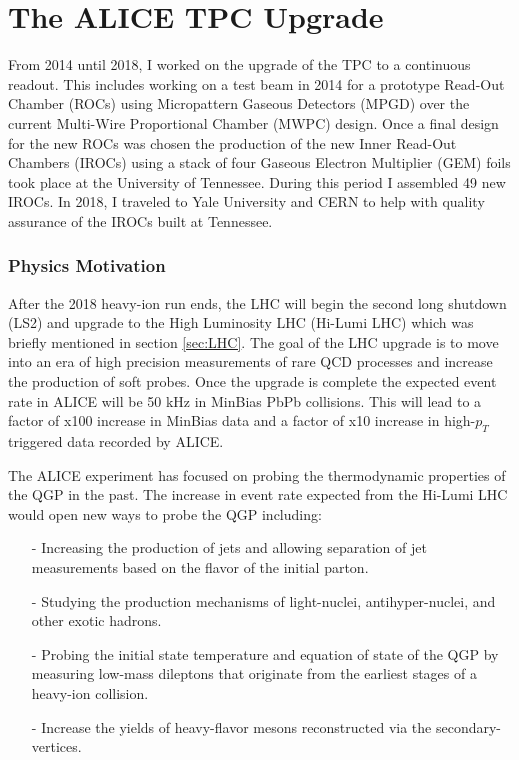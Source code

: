 \chapter{The ALICE TPC Upgrade} \label{ch:tpcu}

From 2014 until 2018, I worked on the upgrade of the TPC to a continuous readout.  This includes working on a test beam in 2014 for a prototype Read-Out Chamber (ROCs) using Micropattern Gaseous Detectors (MPGD) over the current Multi-Wire Proportional Chamber (MWPC) design.  Once a final design for the new ROCs was chosen the production of the new Inner Read-Out Chambers (IROCs) using a stack of four Gaseous Electron Multiplier (GEM) foils took place at the University of Tennessee.  During this period I assembled 49 new IROCs.  In 2018, I traveled to Yale University and CERN to help with quality assurance of the IROCs built at Tennessee.


\subsection{Physics Motivation}
After the 2018 heavy-ion run ends, the LHC will begin the second long shutdown (LS2) and upgrade to the High Luminosity LHC (Hi-Lumi LHC)\cite{Apollinari:2015bam} which was briefly mentioned in section \ref{sec:LHC}.  The goal of the LHC upgrade is to move into an era of high precision measurements of rare QCD processes and increase the production of soft probes.  Once the upgrade is complete the expected event rate in ALICE will be 50 kHz in MinBias PbPb collisions.  This will lead to a factor of x100 increase in MinBias data and a factor of x10 increase in high-$p_{T}$ triggered data recorded by ALICE.

The ALICE experiment has focused on probing the thermodynamic properties of the QGP in the past.  The increase in event rate expected from the Hi-Lumi LHC would open new ways to probe the QGP including\cite{Abelev:1475243}:

\begin{itemize}
\item[-] Increasing the production of jets and allowing separation of jet measurements based on the flavor of the initial parton.
\item[-] Studying the production mechanisms of light-nuclei, antihyper-nuclei, and other exotic hadrons.
\item[-] Probing the initial state temperature and equation of state of the QGP by measuring low-mass dileptons that originate from the earliest stages of a heavy-ion collision.
\item[-] Increase the yields of heavy-flavor mesons reconstructed via the secondary-vertices. 
\end{itemize}

